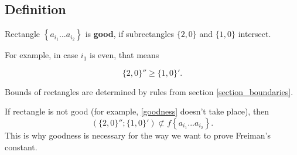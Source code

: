 \subsection{Definition}

\begin{definition}
	Rectangle $\left\{ a_{i_1} ... a_{i_2} \right\}$ is \textbf{good},
	if subrectangles
	$\{2, 0\}$ and $\{1, 0\}$ intersect.
\end{definition}

For example, in case $i_1$ is even, that means

\begin{equation}\tag{6.3}\label{goodness}
	\{2, 0\}'' \geqslant \{1, 0\}'.
\end{equation}

Bounds of rectangles are determined by rules from section \ref{section_boundaries}.

If rectangle is not good (for example, \ref{goodness} doesn't take place), then
$$ ( \{2, 0\}'' ; \{1, 0\}' ) \not\subset
f \left\{ a_{i_1} ... a_{i_2} \right\}. $$
This is why goodness is necessary for the way we want to prove Freiman's constant.
